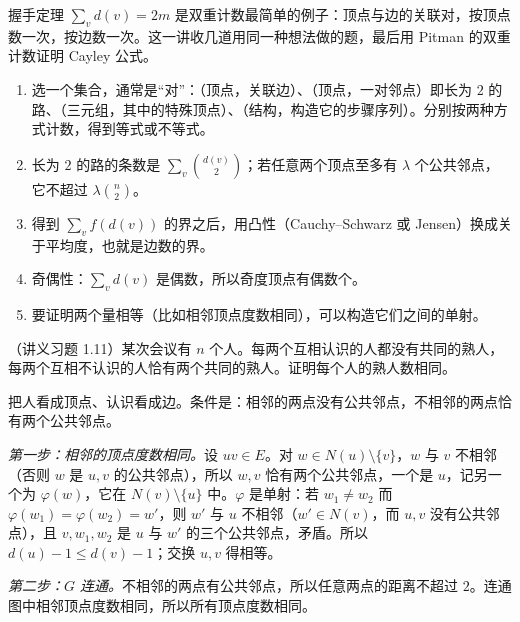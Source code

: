 \label{lec:double-counting}

握手定理 $\sum_vd(v)=2m$ 是双重计数最简单的例子：顶点与边的关联对，按顶点数一次，按边数一次。这一讲收几道用同一种想法做的题，最后用 Pitman 的双重计数证明 Cayley 公式。


\begin{enumerate}
\item 选一个集合，通常是“对”：（顶点，关联边）、（顶点，一对邻点）即长为 $2$ 的路、（三元组，其中的特殊顶点）、（结构，构造它的步骤序列）。分别按两种方式计数，得到等式或不等式。
\item 长为 $2$ 的路的条数是 $\sum_v\binom{d(v)}2$；若任意两个顶点至多有 $\lambda$ 个公共邻点，它不超过 $\lambda\binom n2$。
\item 得到 $\sum_vf(d(v))$ 的界之后，用凸性（Cauchy--Schwarz 或 Jensen）换成关于平均度，也就是边数的界。
\item 奇偶性：$\sum_vd(v)$ 是偶数，所以奇度顶点有偶数个。
\item 要证明两个量相等（比如相邻顶点度数相同），可以构造它们之间的单射。
\end{enumerate}

\begin{workedexample}\label{we:double-counting:acquaintances}
（讲义习题 1.11）某次会议有 $n$ 个人。每两个互相认识的人都没有共同的熟人，每两个互相不认识的人恰有两个共同的熟人。证明每个人的熟人数相同。
\end{workedexample}
\begin{solution}
把人看成顶点、认识看成边。条件是：相邻的两点没有公共邻点，不相邻的两点恰有两个公共邻点。

\emph{第一步：相邻的顶点度数相同。}设 $uv\in E$。对 $w\in N(u)\setminus\{v\}$，$w$ 与 $v$ 不相邻（否则 $w$ 是 $u,v$ 的公共邻点），所以 $w,v$ 恰有两个公共邻点，一个是 $u$，记另一个为 $\varphi(w)$，它在 $N(v)\setminus\{u\}$ 中。$\varphi$ 是单射：若 $w_1\neq w_2$ 而 $\varphi(w_1)=\varphi(w_2)=w'$，则 $w'$ 与 $u$ 不相邻（$w'\in N(v)$，而 $u,v$ 没有公共邻点），且 $v,w_1,w_2$ 是 $u$ 与 $w'$ 的三个公共邻点，矛盾。所以 $d(u)-1\leqslant d(v)-1$；交换 $u,v$ 得相等。

\emph{第二步：$G$ 连通。}不相邻的两点有公共邻点，所以任意两点的距离不超过 $2$。连通图中相邻顶点度数相同，所以所有顶点度数相同。
\end{solution}

